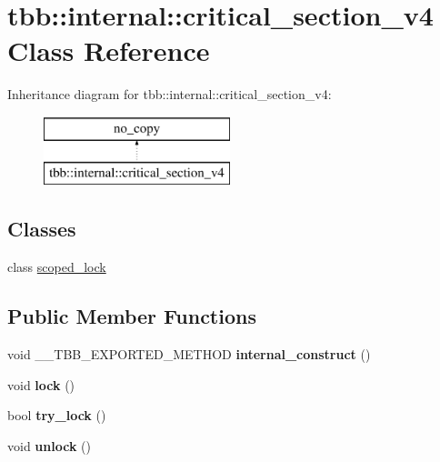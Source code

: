 \hypertarget{classtbb_1_1internal_1_1critical__section__v4}{}\section{tbb\+:\+:internal\+:\+:critical\+\_\+section\+\_\+v4 Class Reference}
\label{classtbb_1_1internal_1_1critical__section__v4}
Inheritance diagram for tbb\+:\+:internal\+:\+:critical\+\_\+section\+\_\+v4\+:\begin{figure}[H]
\begin{center}
\leavevmode
\includegraphics[height=2.000000cm]{classtbb_1_1internal_1_1critical__section__v4}
\end{center}
\end{figure}
\subsection*{Classes}
\begin{DoxyCompactItemize}
\item 
class \hyperlink{classtbb_1_1internal_1_1critical__section__v4_1_1scoped__lock}{scoped\+\_\+lock}
\end{DoxyCompactItemize}
\subsection*{Public Member Functions}
\begin{DoxyCompactItemize}
\item 
\hypertarget{classtbb_1_1internal_1_1critical__section__v4_a415b8cb855f9fa9e96f7c161fd750585}{}void \+\_\+\+\_\+\+T\+B\+B\+\_\+\+E\+X\+P\+O\+R\+T\+E\+D\+\_\+\+M\+E\+T\+H\+O\+D {\bfseries internal\+\_\+construct} ()\label{classtbb_1_1internal_1_1critical__section__v4_a415b8cb855f9fa9e96f7c161fd750585}

\item 
\hypertarget{classtbb_1_1internal_1_1critical__section__v4_afb1ccdfc59fdd3f5a3a8db17c56102e8}{}void {\bfseries lock} ()\label{classtbb_1_1internal_1_1critical__section__v4_afb1ccdfc59fdd3f5a3a8db17c56102e8}

\item 
\hypertarget{classtbb_1_1internal_1_1critical__section__v4_adbbd611ea04432e112b08e56251bc8b5}{}bool {\bfseries try\+\_\+lock} ()\label{classtbb_1_1internal_1_1critical__section__v4_adbbd611ea04432e112b08e56251bc8b5}

\item 
\hypertarget{classtbb_1_1internal_1_1critical__section__v4_a081d4eae71879fd7dcf2c4ca9ea7fb67}{}void {\bfseries unlock} ()\label{classtbb_1_1internal_1_1critical__section__v4_a081d4eae71879fd7dcf2c4ca9ea7fb67}

\end{DoxyCompactItemize}

